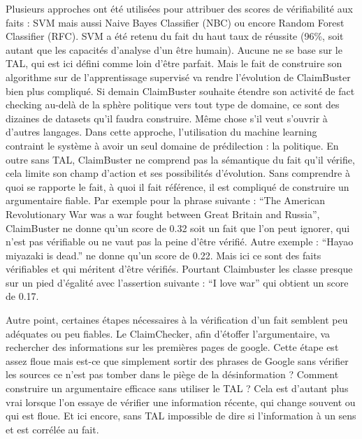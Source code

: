 Plusieurs approches ont été utilisées pour attribuer des scores de vérifiabilité aux faits : SVM mais aussi Naive Bayes Classifier (NBC) ou encore Random Forest Classifier (RFC). SVM a été retenu du fait du haut taux de réussite (96\%, soit autant que les capacités d'analyse d'un être humain). Aucune ne se base sur le TAL, qui est ici défini comme loin d'être parfait. Mais le fait de construire son algorithme sur de l'apprentissage supervisé va rendre l'évolution de ClaimBuster bien plus compliqué. Si demain ClaimBuster souhaite étendre son activité de fact checking au-delà de la sphère politique vers tout type de domaine, ce sont des dizaines de datasets qu'il faudra construire. Même chose s'il veut s'ouvrir à d'autres langages. Dans cette approche, l'utilisation du machine learning contraint le système à avoir un seul domaine de prédilection : la politique. En outre sans TAL, ClaimBuster ne comprend pas la sémantique du fait qu'il vérifie, cela limite son champ d'action et ses possibilités d'évolution. Sans comprendre à quoi se rapporte le fait, à quoi il fait référence, il est compliqué de construire un argumentaire fiable. Par exemple pour la phrase suivante : \enquote{The American Revolutionary War was a war fought between Great Britain and Russia}, ClaimBuster ne donne qu'un score de 0.32 soit un fait que l'on peut ignorer, qui n'est pas vérifiable ou ne vaut pas la peine d'être vérifié. Autre exemple : \enquote{Hayao miyazaki is dead.} ne donne qu'un score de 0.22. Mais ici ce sont des faits vérifiables et qui méritent d'être vérifiés. Pourtant Claimbuster les classe presque sur un pied d'égalité avec l'assertion suivante : \enquote{I love war} qui obtient un score de 0.17. 

Autre point, certaines étapes nécessaires à la vérification d'un fait semblent peu adéquates ou peu fiables. Le ClaimChecker, afin d'étoffer l'argumentaire, va rechercher des informations sur les premières pages de google. Cette étape est assez floue mais est-ce que simplement sortir des phrases de Google sans vérifier les sources ce n'est pas tomber dans le piège de la désinformation ? Comment construire un argumentaire efficace sans utiliser le TAL ? Cela est d'autant plus vrai lorsque l'on essaye de vérifier une information récente, qui change souvent ou qui est floue. Et ici encore, sans TAL impossible de dire si l'information à un sens et est corrélée au fait.


